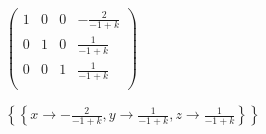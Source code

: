 \documentclass[11pt,a4paper]{article}
\begin{document}
\begin{doublespace}
\noindent\(\left(
\begin{array}{cccc}
 1 & 0 & 0 & -\frac{2}{-1+k} \\
 0 & 1 & 0 & \frac{1}{-1+k} \\
 0 & 0 & 1 & \frac{1}{-1+k} \\
\end{array}
\right)\)
\end{doublespace}

\begin{doublespace}
\noindent\(\left\{\left\{x\to -\frac{2}{-1+k},y\to \frac{1}{-1+k},z\to \frac{1}{-1+k}\right\}\right\}\)
\end{doublespace}

\clearpage

\printbibliography

\end{document}
